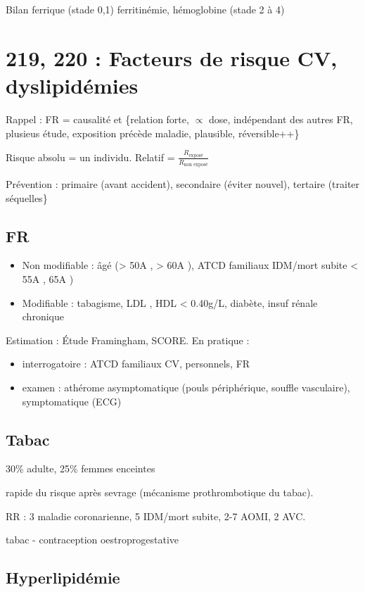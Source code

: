 \documentclass[11pt]{article}
\begin{document}
Bilan ferrique (stade 0,1) ferritinémie, hémoglobine (stade 2 à 4)

\section{219, 220 :  Facteurs de risque CV, dyslipidémies}
\label{sec:org8ac76f4}
Rappel : FR = causalité et \{relation forte, \(\propto\) dose, indépendant des autres
FR, plusieus étude, exposition précède maladie, plausible, réversible++\}

Risque absolu = un individu. Relatif = \(\frac{R_{\text{exposé}}}{R_{\text{non exposé}}}\)

Prévention : primaire (avant accident), secondaire (éviter nouvel), tertaire
(traiter séquelles\}

\subsection{FR}
\label{sec:org1652972}
\begin{itemize}
\item Non modifiable : âgé (> 50A \male, > 60A \female), ATCD familiaux IDM/mort
subite < 55A \male, 65A \female)
\item Modifiable : tabagisme, LDL \inc, HDL < 0.40g/L, diabète, insuf rénale
chronique
\end{itemize}

Estimation : Étude Framingham, SCORE. En pratique : 
\begin{itemize}
\item interrogatoire  : ATCD familiaux CV, personnels, FR
\item examen : athérome asymptomatique (pouls périphérique, souffle vasculaire),
symptomatique (ECG)
\end{itemize}

\subsection{Tabac}
\label{sec:org0529ce4}
30\% adulte, 25\% femmes enceintes

\inc rapide du risque après sevrage (mécanisme prothrombotique du tabac). 

RR : 3 maladie coronarienne, 5 IDM/mort subite, 2-7 AOMI, 2 AVC.

\danger tabac - contraception oestroprogestative

\subsection{Hyperlipidémie}
\label{sec:org9e6f518}
\end{document}

